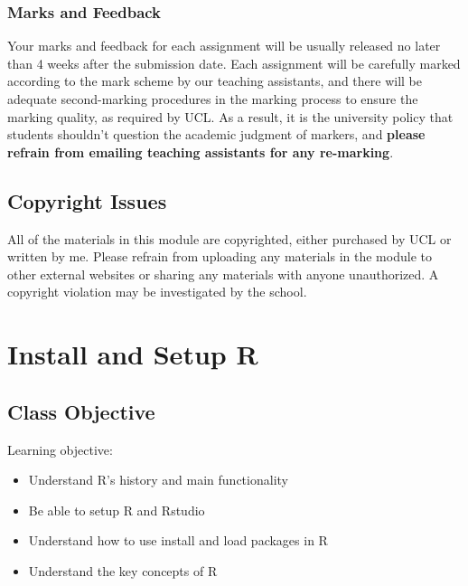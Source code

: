 \documentclass[
  11pt,
]{book}
\begin{document}
\hypertarget{marks-and-feedback}{%
\subsection{Marks and Feedback}\label{marks-and-feedback}}

Your marks and feedback for each assignment will be usually released no later than 4 weeks after the submission date. Each assignment will be carefully marked according to the mark scheme by our teaching assistants, and there will be adequate second-marking procedures in the marking process to ensure the marking quality, as required by UCL. As a result, it is the university policy that students shouldn't question the academic judgment of markers, and \textbf{please refrain from emailing teaching assistants for any re-marking}.

\hypertarget{copyright-issues}{%
\section{Copyright Issues}\label{copyright-issues}}

All of the materials in this module are copyrighted, either purchased by UCL or written by me. Please refrain from uploading any materials in the module to other external websites or sharing any materials with anyone unauthorized. A copyright violation may be investigated by the school.

\hypertarget{install-and-setup-r}{%
\chapter{Install and Setup R}\label{install-and-setup-r}}

\hypertarget{class-objective}{%
\section{Class Objective}\label{class-objective}}

Learning objective:

\begin{itemize}
\item
  Understand R's history and main functionality
\item
  Be able to setup R and Rstudio
\item
  Understand how to use install and load packages in R
\item
  Understand the key concepts of R
\end{itemize}
\end{document}
